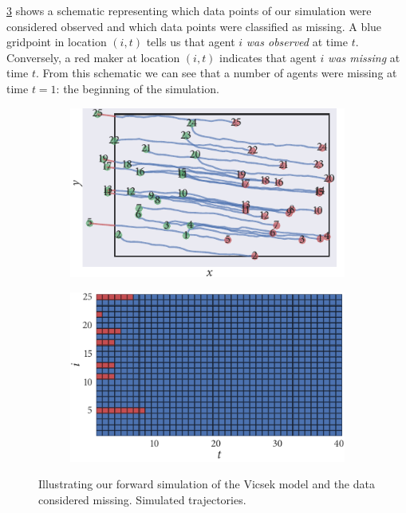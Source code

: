 \cref{subfig:beg_missing} shows a schematic representing which data points of
our simulation were considered observed and which data points were classified
as missing. A blue gridpoint in location $(i, t)$ tells us that agent $i$
\emph{was observed} at time $t$. Conversely, a red maker at location $(i, t)$
indicates that agent $i$ \emph{was missing} at time $t$. From this schematic we
can see that a number of agents were missing at time $t=1$: the beginning of
the simulation.

\begin{figure}[tbp]
  \begin{subfigure}[b]{0.5\textwidth}
    \includegraphics{beg/data.pdf}
    \caption{}
    \label{subfig:beg_data}
  \end{subfigure}%
  \begin{subfigure}[b]{0.5\textwidth}
    \includegraphics{beg/missing_array.pdf}
    \caption{}
    \label{subfig:beg_missing}
  \end{subfigure}
  \caption{Illustrating our forward simulation of the Vicsek model and the
    data considered missing.  Simulated trajectories.
}
\end{figure}
